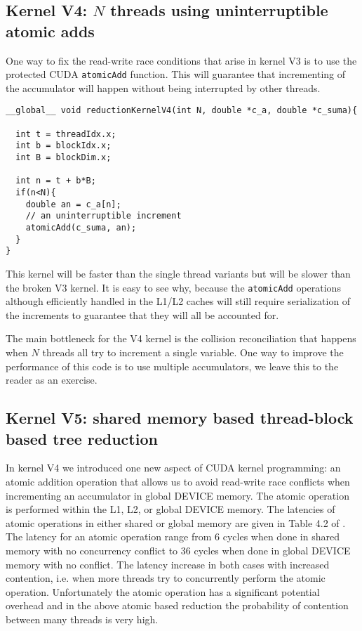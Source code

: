 \subsection{Kernel  V4: $N$ threads using uninterruptible atomic adds}

One way to fix the read-write race conditions that arise in kernel V3 is to use the protected CUDA \texttt{atomicAdd} function. This will guarantee that incrementing of the accumulator will happen without being interrupted by other threads.

\begin{verbatim}
__global__ void reductionKernelV4(int N, double *c_a, double *c_suma){

  int t = threadIdx.x;
  int b = blockIdx.x;
  int B = blockDim.x;

  int n = t + b*B;
  if(n<N){
    double an = c_a[n];
    // an uninterruptible increment   
    atomicAdd(c_suma, an);
  }
}
\end{verbatim}
This kernel will be faster than the single thread variants but will be slower than the broken V3 kernel. It is easy to see why, because the \texttt{atomicAdd} operations although efficiently handled in the L1/L2 caches will still require serialization of the increments to guarantee that they will all be accounted for.

The main bottleneck for the V4 kernel is the collision reconciliation that happens when $N$ threads all try to increment a single variable. One way to improve the performance of this code is to use multiple accumulators, we leave this to the reader as an exercise.

\subsection{Kernel  V5: shared memory based thread-block based tree reduction}

In kernel V4 we introduced one new aspect of CUDA kernel programming: an atomic addition operation that allows us to avoid read-write race conflicts when incrementing an accumulator in global DEVICE memory. The atomic operation is performed within the L1, L2, or global DEVICE memory. The latencies of atomic operations in either shared or global memory are given in Table 4.2 of \cite{jia2018dissecting}. The latency for an atomic operation range from 6 cycles when done in shared memory with no concurrency conflict to 36 cycles when done in global DEVICE memory with no conflict. The latency increase in both cases with increased contention, i.e. when more threads try to concurrently perform the atomic operation. Unfortunately the atomic operation has a significant potential overhead and in the above atomic based reduction the probability of  contention between many threads is very high.

